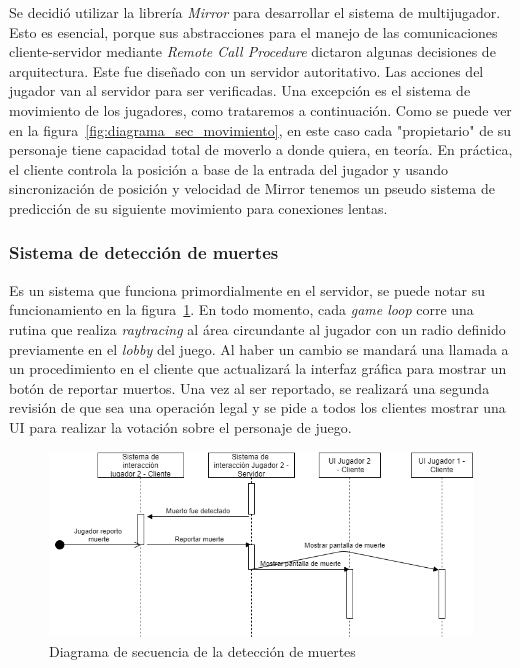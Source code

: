 Se decidió utilizar la librería \textit{Mirror} para desarrollar el sistema de multijugador. Esto es esencial, porque sus abstracciones para el manejo de las comunicaciones cliente-servidor mediante \textit{Remote Call Procedure} dictaron algunas decisiones de arquitectura.
Este fue diseñado con un servidor autoritativo. Las acciones del jugador van al servidor para ser verificadas. Una excepción es el sistema de movimiento de los jugadores, como trataremos a continuación. Como se puede ver en la figura~\ref{fig:diagrama_sec_movimiento}, en este caso cada "propietario" de su personaje tiene capacidad total de moverlo a donde quiera, en teoría. En práctica, el cliente controla la posición a base de la entrada del jugador y usando sincronización de posición y velocidad de Mirror tenemos un pseudo sistema de predicción de su siguiente movimiento para conexiones lentas. 

\subsubsection{Sistema de detección de muertes}
Es un sistema que funciona primordialmente en el servidor, se puede notar su funcionamiento en la figura~\ref{fig:diagrama_sec_detect_muertes}. En todo momento, cada \textit{game loop} corre una rutina que realiza \textit{raytracing} al área circundante al jugador con un radio definido previamente en el \textit{lobby} del juego. Al haber un cambio se mandará una llamada a un procedimiento en el cliente que actualizará la interfaz gráfica para mostrar un botón de reportar muertos. Una vez al ser reportado, se realizará una segunda revisión de que sea una operación legal y se pide a todos los clientes mostrar una UI para realizar la votación sobre el personaje de juego.
\begin{figure}[h!]
    \centering
    \includegraphics[width=1\linewidth]{images/diagrama_deteccion_muerte.png}
    \caption{Diagrama de secuencia de la detección de muertes}
    \label{fig:diagrama_sec_detect_muertes}
\end{figure}


